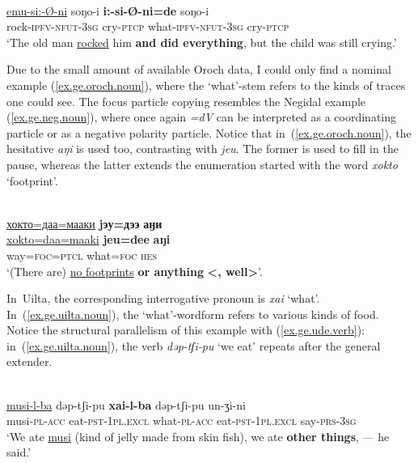 \documentclass[output=paper,colorlinks,citecolor=brown
\ChapterDOI{10.5281/zenodo.15697577}
]{langscibook}
\begin{document}
 \ea \label{ex.ge.ude.verb}
 \\
 \gll \uline{emu-si:-Ø-ni} soŋo-i \textbf{i:-si-Ø-ni=de} soŋo-i\\
rock-\textsc{ipfv}-\textsc{nfut}-\textsc{3sg} cry-\textsc{ptcp} what-\textsc{ipfv}-\textsc{nfut}-\textsc{3sg} cry-\textsc{ptcp}\\
\glt `The old man \uline{rocked} him \textbf{and did everything}, but the child was still crying.' \\
 \z
{}

Due to the small amount of available Oroch data, I could only find a nominal example (\ref{ex.ge.oroch.noun}), where the `what'-stem refers to the kinds of traces one could see. The focus particle copying resembles the Negidal example (\ref{ex.ge.neg.noun}), where once again \textit{=dV} can be interpreted as a coordinating particle or as a negative polarity particle. Notice that in~(\ref{ex.ge.oroch.noun}), the hesitative \textit{aŋi} is used too, contrasting with \textit{jeu}. The former is used to fill in the pause, whereas the latter extends the enumeration started with the word \textit{xokto} `footprint'.

 \ea \label{ex.ge.oroch.noun}
 \\
 \glll \uline{хокто=даа=мааки} \textbf{jэу=дээ} \textbf{аӈи}\\
 \uline{xokto=daa=maaki} \textbf{jeu=dee} \textbf{aŋi}\\
way=\textsc{foc}=\textsc{ptcl} what=\textsc{foc} \textsc{hes}\\
\glt `(There are) \uline{no footprints} \textbf{or anything} \textbf{<, well>}'. \\
 \z
{}

In~Uilta, the corresponding interrogative pronoun is \textit{xai} `what'. In~(\ref{ex.ge.uilta.noun}), the `what'-wordform refers to various kinds of food. Notice the structural parallelism of this example with (\ref{ex.ge.ude.verb}): in~(\ref{ex.ge.uilta.noun}), the verb \textit{dəp-tʃi-pu} `we eat' repeats after the general extender.

 \ea \label{ex.ge.uilta.noun}
 \\
 \gll \uline{musi-l-ba} dəp-tʃi-pu \textbf{xai-l-ba} dəp-tʃi-pu un-ʒi-ni\\
 musi-\textsc{pl}-\textsc{acc} eat-\textsc{pst}-\textsc{1pl.excl} what-\textsc{pl}-\textsc{acc} eat-\textsc{pst}-\textsc{1pl.excl} say-\textsc{prs}-\textsc{3sg}\\
\glt `We ate \uline{musi} (kind of jelly made from skin fish), we ate \textbf{other things}, — he said.' \\
 \z
{}
\end{document}
